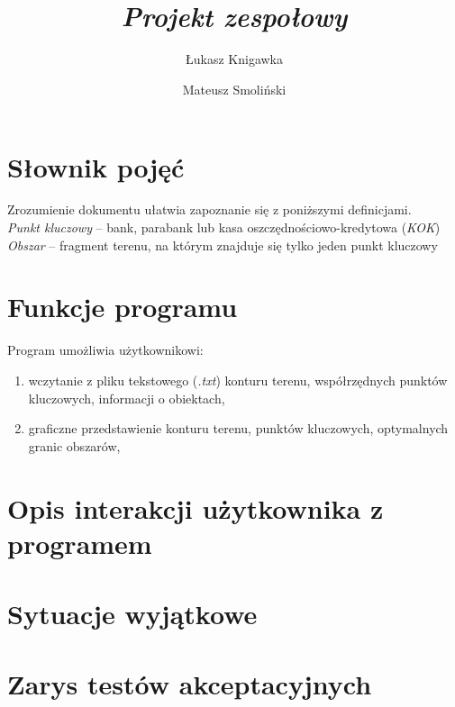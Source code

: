 \documentclass[a4paper,12pt]{article}
\title{ \sc{Specyfikacja funkcjonalna} \\
\emph{Projekt zespołowy} }
\author{Łukasz Knigawka \and Mateusz Smoliński}
\newcommand\tab[1][0.6cm]{\hspace*{#1} }
\begin{document}
\maketitle

\thispagestyle{empty}

\tableofcontents

\newpage

\section{Słownik pojęć}

\tab Zrozumienie dokumentu ułatwia zapoznanie się z poniższymi definicjami.
\\\textit{Punkt kluczowy} -- bank, parabank lub kasa oszczędnościowo-kredytowa (\textit{KOK})
\\\textit{Obszar} -- fragment terenu, na którym znajduje się tylko jeden punkt kluczowy

\section{Funkcje programu}

\tab Program umożliwia użytkownikowi:
\begin{enumerate}
\item wczytanie z pliku tekstowego (\textit{.txt}) konturu terenu, współrzędnych punktów kluczowych, informacji o obiektach,
\item graficzne przedstawienie konturu terenu, punktów kluczowych, optymalnych granic obszarów,

\end{enumerate}

\section{Opis interakcji użytkownika z programem}



\section{Sytuacje wyjątkowe}

\section{Zarys testów akceptacyjnych}
\end{document}

